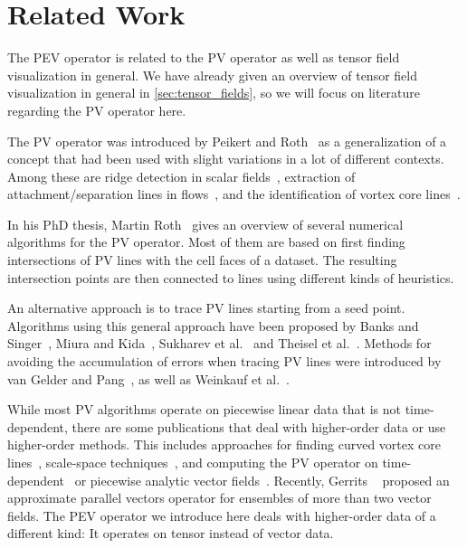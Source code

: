 \section{Related Work} %
\label{sec:pev_related_work}
%
The \ac{PEV} operator is related to the \ac{PV} operator as well as tensor field
visualization in general.
%
We have already given an overview of tensor field visualization in general in
\cref{sec:tensor_fields}, so we will focus on literature regarding the \ac{PV}
operator here.
%

%
The \ac{PV} operator was introduced by Peikert and Roth~\cite{Peikert1999} as a
generalization of a concept that had been used with slight variations in a lot
of different contexts.
%
Among these are ridge detection in scalar fields~\cite{Haralick1983},
extraction of attachment/separation lines in flows~\cite{Kenwright1999},
and the identification of vortex core lines~\cite{Sujudi1995,Banks1995}.
%

%
In his PhD thesis, Martin Roth~\cite{Roth2000} gives an overview of several
numerical algorithms for the \ac{PV} operator.
%
Most of them are based on first finding intersections of \ac{PV} lines with the
cell faces of a dataset.
%
The resulting intersection points are then connected to lines using different
kinds of heuristics.
%

%
An alternative approach is to trace \ac{PV} lines starting from a seed point.
%
Algorithms using this general approach have been proposed by Banks and
Singer~\cite{Banks1995}, Miura and Kida~\cite{Miura1997}, Sukharev et
al.~\cite{Sukharev2006} and Theisel et al.~\cite{Theisel2003a}.
%
Methods for avoiding the accumulation of errors when tracing \ac{PV} lines were
introduced by van Gelder and Pang~\cite{Gelder2009}, as well as Weinkauf et
al.~\cite{Weinkauf2011}.
%

%
While most \ac{PV} algorithms operate on piecewise linear data that is not
time-dependent, there are some publications that deal with higher-order data
or use higher-order methods.
%
This includes approaches for finding curved vortex core lines~\cite{Roth1998},
scale-space techniques~\cite{Bauer2002}, and computing the \ac{PV} operator on
time-dependent~\cite{Theisel2005,Fuchs2007} or piecewise analytic vector
fields~\cite{Pagot2011}.
%
Recently, Gerrits \etal~\cite{Gerrits2018} proposed an approximate parallel
vectors operator for ensembles of more than two vector fields.
%
The \ac{PEV} operator we introduce here deals with higher-order data of a
different kind: It operates on tensor instead of vector data.
%
